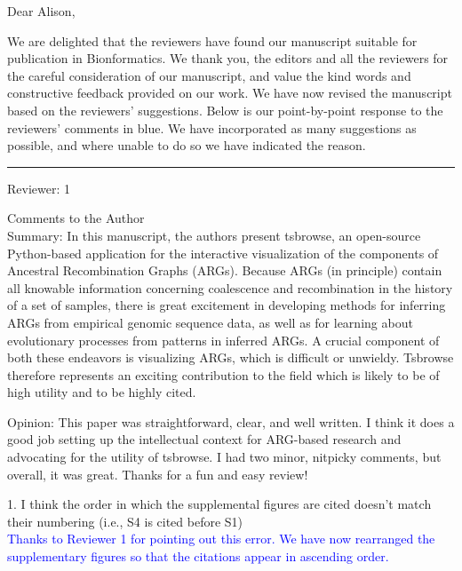 \documentclass{letter}
\begin{document}
\begin{letter}{}

\opening{Dear Alison,}

We are delighted that the reviewers have found our manuscript suitable for publication 
in Bionformatics. We thank you, the editors and all the reviewers for the careful 
consideration of our manuscript, and value the kind words and constructive feedback 
provided on our work. We have now revised the manuscript based on the reviewers' 
suggestions. Below is our point-by-point response to the 
reviewers' comments in blue. We have incorporated as many suggestions as possible, 
and where unable to do so we have indicated the reason.\\

\hrule

Reviewer: 1

Comments to the Author \\

Summary: In this manuscript, the authors present tsbrowse, an open-source Python-based 
application for the interactive visualization of the components of Ancestral Recombination 
Graphs (ARGs). Because ARGs (in principle) contain all knowable information concerning 
coalescence and recombination in the history of a set of samples, there is great excitement 
in developing methods for inferring ARGs from empirical genomic sequence data, as well as 
for learning about evolutionary processes from patterns in inferred ARGs. A crucial component 
of both these endeavors is visualizing ARGs, which is difficult or unwieldy. Tsbrowse therefore 
represents an exciting contribution to the field which is likely to be of high utility and 
to be highly cited.

Opinion: This paper was straightforward, clear, and well written. I think it does a good job 
setting up the intellectual context for ARG-based research and advocating for the utility of 
tsbrowse. I had two minor, nitpicky comments, but overall, it was great.  Thanks for a fun and 
easy review!

1. I think the order in which the supplemental figures are cited doesn’t match their numbering 
(i.e., S4 is cited before S1)\\
\textcolor{blue}{Thanks to Reviewer 1 for pointing out this error. We have now rearranged the 
supplementary figures so that the citations appear in ascending order.}


\end{letter}
\end{document}
